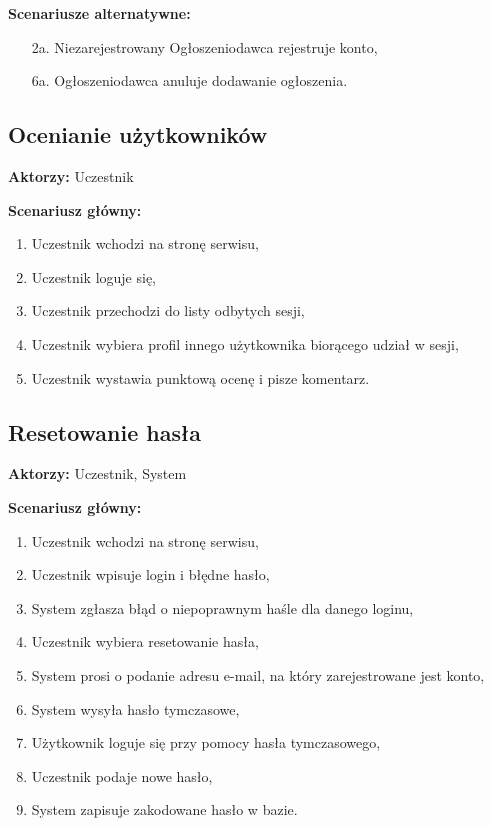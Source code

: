 \textbf{Scenariusze alternatywne:}
	\begin{enumerate}
	\item[2a.] Niezarejestrowany Ogłoszeniodawca rejestruje konto,
	\item[6a.] Ogłoszeniodawca anuluje dodawanie ogłoszenia.
	\end{enumerate}

\subsection{Ocenianie użytkowników}

\textbf{Aktorzy:} Uczestnik

\textbf{Scenariusz główny:}
	\begin{enumerate}
	\item Uczestnik wchodzi na stronę serwisu,
	\item Uczestnik loguje się,
	\item Uczestnik przechodzi do listy odbytych sesji,
	\item Uczestnik wybiera profil innego użytkownika biorącego udział w sesji,
	\item Uczestnik wystawia punktową ocenę i pisze komentarz.
	\end{enumerate}

\subsection{Resetowanie hasła}

\textbf{Aktorzy:} Uczestnik, System

\textbf{Scenariusz główny:}
	\begin{enumerate}
	\item Uczestnik wchodzi na stronę serwisu,
	\item Uczestnik wpisuje login i błędne hasło,
	\item System zgłasza błąd o niepoprawnym haśle dla danego loginu,
	\item Uczestnik wybiera resetowanie hasła,
	\item System prosi o podanie adresu e-mail, na który zarejestrowane jest konto,
	\item System wysyła hasło tymczasowe,
	\item Użytkownik loguje się przy pomocy hasła tymczasowego,
	\item Uczestnik podaje nowe hasło,
	\item System zapisuje zakodowane hasło w bazie.
	\end{enumerate}

